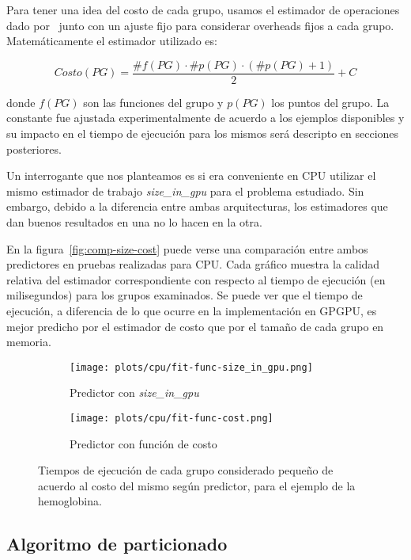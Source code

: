 Para tener una idea del costo de cada grupo, usamos el estimador de operaciones
dado por~\cite{LIO} junto con un ajuste fijo para considerar overheads fijos a
cada grupo. Matem\'aticamente el estimador utilizado es:

\begin{equation}
    Costo(PG) = \frac{\#f(PG) \cdot \#p(PG) \cdot (\#p(PG) + 1)}{2} + C
\end{equation}

donde $f(PG)$ son las funciones del grupo y $p(PG)$ los puntos del grupo. La
constante fue ajustada experimentalmente de acuerdo a los ejemplos disponibles y
su impacto en el tiempo de ejecuci\'on para los mismos ser\'a descripto en
secciones posteriores.

Un interrogante que nos planteamos es si era conveniente en CPU utilizar el mismo
estimador de trabajo \textit{size\_in\_gpu} para el problema estudiado. Sin
embargo, debido a la diferencia entre ambas arquitecturas, los estimadores que
dan buenos resultados en una no lo hacen en la otra.

En la figura~\ref{fig:comp-size-cost} puede verse una comparaci\'on entre ambos
predictores en pruebas realizadas para CPU. Cada gr\'afico muestra la calidad
relativa del estimador correspondiente con respecto al tiempo de ejecuci\'on
(en milisegundos) para los grupos examinados. Se puede ver que el tiempo de
ejecuci\'on, a diferencia de lo que ocurre en la implementaci\'on en GPGPU, es
mejor predicho por el estimador de costo que por el tama\~no de cada grupo en
memoria.

\begin{figure}[htbp]
   \centering
   \begin{subfigure}[b]{\plotwidthtres}
     \texttt{[image: plots/cpu/fit-func-size\_in\_gpu.png]}
     \caption{Predictor con \textit{size\_in\_gpu}}
   \end{subfigure}
   \begin{subfigure}[b]{\plotwidthtres}
     \texttt{[image: plots/cpu/fit-func-cost.png]}
     \caption{Predictor con funci\'on de costo}
   \end{subfigure}
   \caption{Tiempos de ejecuci\'on de cada grupo considerado peque\~no de acuerdo
    al costo del mismo seg\'un predictor, para el ejemplo de la hemoglobina.}
   \label{fig:lio-histo-groups}
\end{figure}

\subsection{Algoritmo de particionado}

